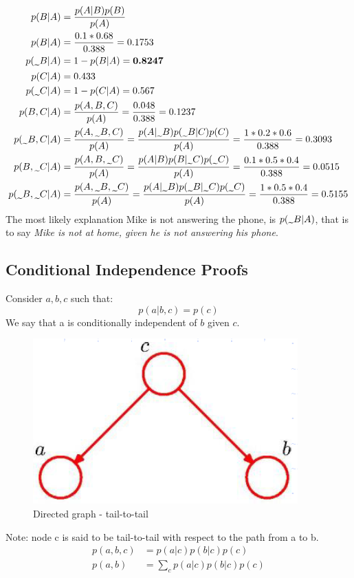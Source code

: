 \begin{align*}
p(B|A) & = \frac{p(A|B)p(B)}{p(A)} \\
p(B|A) & = \frac{0.1*0.68}{0.388} = 0.1753\\
p(\midtilde B|A) & = 1 - p(B|A) = \textbf{0.8247} \\
p(C|A) & = 0.433 \\
p(\midtilde C|A) & = 1 - p(C|A) = 0.567 \\
p(B,C|A) & = \frac{p(A,B,C)}{p(A)} = \frac{0.048}{0.388} = 0.1237 \\
p(\midtilde B, C|A) & = \frac{p(A,\midtilde B,C)}{p(A)}  = \frac{p(A|\midtilde B)p(\midtilde B|C) p(C)}{p(A)} = \frac{1*0.2*0.6}{0.388} = 0.3093\\
p(B, \midtilde C|A) & = \frac{p(A,B,\midtilde C)}{p(A)}  = \frac{p(A|B)p(B|\midtilde C) p(\midtilde C)}{p(A)} = \frac{0.1*0.5*0.4}{0.388} = 0.0515 \\
p(\midtilde B, \midtilde C | A) & = \frac{p(A,\midtilde B,\midtilde C)}{p(A)}  = \frac{p(A|\midtilde B)p(\midtilde B|\midtilde C) p(\midtilde C)}{p(A)} = \frac{1*0.5*0.4}{0.388} = 0.5155 \\
\end{align*}
The most likely explanation Mike is not answering the phone, is $p(\midtilde B|A)$, that is to say \textit{Mike is not at home, given he is not answering his phone}.

\subsection{Conditional Independence Proofs}
Consider $a, b, c$ such that:
$$
p(a|b,c) = p(c)
$$
We say that a is \textbf{}{conditionally independent} of $b$ given $c$.
\begin{figure}[H]
 \centering 
\includegraphics[scale=0.42]{images/tail-to-tail.png} 
 \caption{Directed graph - tail-to-tail}
 \label{fig:tail-to-tail}
\end{figure}
Note: node c is said to be tail-to-tail with respect to the path from a to b.
\begin{align*}
    p(a,b,c) & = p(a|c)p(b|c)p(c) \\
    p(a,b) & = \sum_c p(a|c)p(b|c)p(c) \\
\end{align*}

